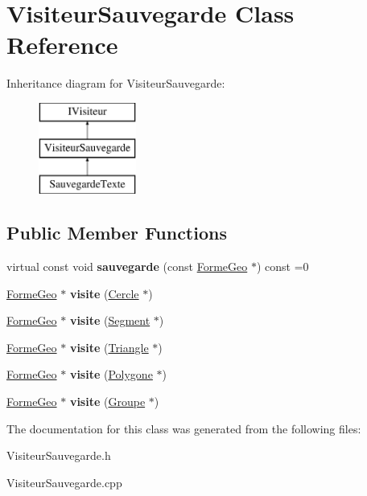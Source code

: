 \hypertarget{class_visiteur_sauvegarde}{}\section{Visiteur\+Sauvegarde Class Reference}
\label{class_visiteur_sauvegarde}
Inheritance diagram for Visiteur\+Sauvegarde\+:\begin{figure}[H]
\begin{center}
\leavevmode
\includegraphics[height=3.000000cm]{d0/dfc/class_visiteur_sauvegarde}
\end{center}
\end{figure}
\subsection*{Public Member Functions}
\begin{DoxyCompactItemize}
\item 
\mbox{\label{class_visiteur_sauvegarde_ae5adf3d0957979330309046f7a115c54}} 
virtual const void {\bfseries sauvegarde} (const \mbox{\hyperlink{class_forme_geo}{Forme\+Geo}} $\ast$) const =0
\item 
\mbox{\label{class_visiteur_sauvegarde_a86f059d1c2e453c41e26365ee6d1d5ac}} 
\mbox{\hyperlink{class_forme_geo}{Forme\+Geo}} $\ast$ {\bfseries visite} (\mbox{\hyperlink{class_cercle}{Cercle}} $\ast$)
\item 
\mbox{\label{class_visiteur_sauvegarde_ab795f305991cb70c57f6b7ce62d89dd7}} 
\mbox{\hyperlink{class_forme_geo}{Forme\+Geo}} $\ast$ {\bfseries visite} (\mbox{\hyperlink{class_segment}{Segment}} $\ast$)
\item 
\mbox{\label{class_visiteur_sauvegarde_aee10a394b190164ba53a1e526696bc93}} 
\mbox{\hyperlink{class_forme_geo}{Forme\+Geo}} $\ast$ {\bfseries visite} (\mbox{\hyperlink{class_triangle}{Triangle}} $\ast$)
\item 
\mbox{\label{class_visiteur_sauvegarde_a435e016460abf8d5e412d587fd182e39}} 
\mbox{\hyperlink{class_forme_geo}{Forme\+Geo}} $\ast$ {\bfseries visite} (\mbox{\hyperlink{class_polygone}{Polygone}} $\ast$)
\item 
\mbox{\label{class_visiteur_sauvegarde_afd99d8f3c3be9e69c2becca5c86043c0}} 
\mbox{\hyperlink{class_forme_geo}{Forme\+Geo}} $\ast$ {\bfseries visite} (\mbox{\hyperlink{class_groupe}{Groupe}} $\ast$)
\end{DoxyCompactItemize}


The documentation for this class was generated from the following files\+:\begin{DoxyCompactItemize}
\item 
Visiteur\+Sauvegarde.\+h\item 
Visiteur\+Sauvegarde.\+cpp\end{DoxyCompactItemize}
